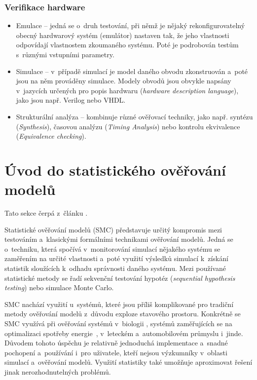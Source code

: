 \subsubsection{Verifikace hardware}
\begin{itemize}
    \item Emulace -- jedná se o~druh testování, při němž je nějaký rekonfigurovatelný obecný hardwarový systém (emulátor) nastaven tak, že jeho vlastnosti odpovídají vlastnostem zkoumaného systému. Poté je podrobován testům s~různými vstupními parametry.
    \item Simulace -- v~případě simulací je model daného obvodu zkonstruován a~poté jsou na něm prováděny simulace. Modely obvodů jsou obvykle napsány v~jazycích určených pro popis hardwaru (\textit{hardware description language}), jako jsou např. Verilog nebo VHDL.
    \item Strukturální analýza -- kombinuje různé ověřovací techniky, jako např. syntézu (\textit{Synthesis}), časovou analýzu (\textit{Timing Analysis}) nebo kontrolu ekvivalence (\textit{Equivalence checking}).
\end{itemize}

\section{Úvod do statistického ověřování modelů}
Tato sekce čerpá z~článku \cite{uppaal_smc}. 

Statistické ověřování modelů (SMC) představuje určitý kompromis mezi testováním a~klasickými formálními technikami ověřování modelů. Jedná se o~techniku, která spočívá v~monitorování simulací nějakého systému se zaměřením na určité vlastnosti a~poté využití výsledků simulací k~získání statistik sloužících k~odhadu správnosti daného systému. Mezi používané statistické metody se řadí sekvenční testování hypotéz (\textit{sequential hypothesis testing}) nebo simulace Monte Carlo.

SMC nachází využití u~systémů, které jsou příliš komplikované pro tradiční metody ověřování modelů z~důvodu exploze stavového prostoru. Konkrétně se SMC využívá při ověřování systémů v~biologii \cite{smc_biology}, systémů zaměřujících se na optimalizaci spotřeby energie~\cite{smc_energy_centric}, v~leteckém a~automobilovém průmyslu i~jinde. Důvodem tohoto úspěchu je relativně jednoduchá implementace a~snadné pochopení a~používání i~pro uživatele, kteří nejsou výzkumníky v~oblasti simulací a~ověřování modelů. Využití statistiky také umožňuje aproximovat řešení jinak nerozhodnutelných problémů.

